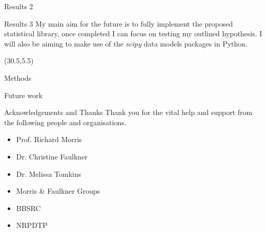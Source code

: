 \documentclass[final]{beamer}
\begin{document}
\begin{frame}{}
\begin{textblock}{28}
\begin{block}{Results 2}
\begin{multicols}{2}
      \end{multicols}




    \end{block}

    \begin{block}{Results 3 }
      My main aim for the future is to fully implement the proposed statistical library,
      once completed I can focus on testing my outlined hypothesis.
      I will also be aiming to make use of the \textit{scipy}
      data models packages in Python.
    \end{block}


  \end{textblock}

  \begin{textblock}{28}(30.5,5.5)

    \begin{block}{Methods}


    \end{block}


    \begin{block}{Future work}

    \end{block}



    \begin{block}{Acknowledgements and Thanks}
      Thank you for the vital help and support from the following people and organisations.

      \begin{multicols}{3}

        \begin{itemize}
        \item{Prof. Richard Morris}
        \item{Dr. Christine Faulkner}

        \end{itemize}

        \columnbreak

        \begin{itemize}
        \item{Dr. Melissa Tomkins}
        \item{Morris \& Faulkner Groups}

        \end{itemize}

        \columnbreak

        \begin{itemize}
        \item{BBSRC}
        \item{NRPDTP}
        \end{itemize}


\end{multicols}
\end{block}
\end{textblock}
\end{frame}
\end{document}
